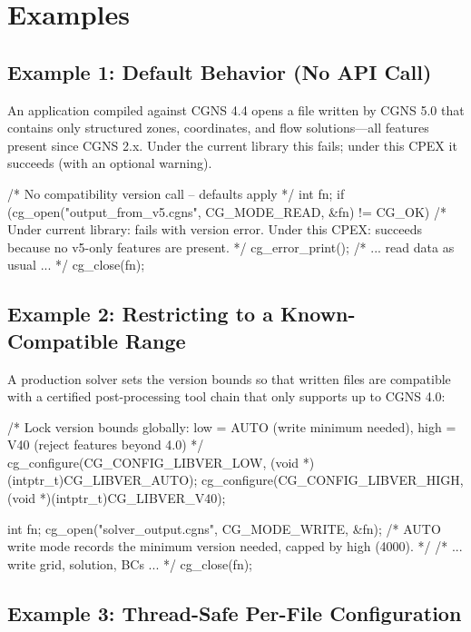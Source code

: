 \documentclass[11pt,letterpaper]{article}
\makeatletter
\let\cgns@orig@lstlisting\lstlisting
\let\cgns@endorig@lstlisting\endlstlisting
\renewenvironment{lstlisting}
  {\par\needspace{5\baselineskip}\nolinenumbers\cgns@orig@lstlisting}
  {\cgns@endorig@lstlisting\par\linenumbers}
\makeatother
\begin{document}
\section{Examples}

\subsection{Example 1: Default Behavior (No API Call)}

An application compiled against CGNS 4.4 opens a file written by
CGNS 5.0 that contains only structured zones, coordinates, and
flow solutions---all features present since CGNS 2.x.  Under the
current library this fails; under this CPEX it succeeds (with an
optional warning).

\begin{lstlisting}[language=C]
/* No compatibility version call -- defaults apply */
int fn;
if (cg_open("output_from_v5.cgns", CG_MODE_READ, &fn)
        != CG_OK) {
    /* Under current library: fails with version error.
       Under this CPEX: succeeds because no v5-only
       features are present. */
    cg_error_print();
}
/* ... read data as usual ... */
cg_close(fn);
\end{lstlisting}

\subsection{Example 2: Restricting to a Known-Compatible Range}

A production solver sets the version bounds so that written files are
compatible with a certified post-processing tool chain that only
supports up to CGNS 4.0:

\begin{lstlisting}[language=C]
/* Lock version bounds globally:
   low  = AUTO (write minimum needed),
   high = V40  (reject features beyond 4.0) */
cg_configure(CG_CONFIG_LIBVER_LOW,  (void *)(intptr_t)CG_LIBVER_AUTO);
cg_configure(CG_CONFIG_LIBVER_HIGH, (void *)(intptr_t)CG_LIBVER_V40);

int fn;
cg_open("solver_output.cgns", CG_MODE_WRITE, &fn);
/* AUTO write mode records the minimum version needed,
   capped by high (4000). */
/* ... write grid, solution, BCs ... */
cg_close(fn);
\end{lstlisting}

\subsection{Example 3: Thread-Safe Per-File Configuration}
\end{document}
